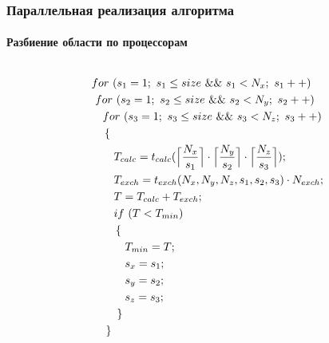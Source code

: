 \begin{frame}
\begin{center}
\frametitle{Параллельная реализация алгоритма}
\framesubtitle{Разбиение области по процессорам}

\begin{figure}
\begin{columns}[T]

\begin{column}{.4\textwidth}
\begin{scriptsize}
\begin{equation*}
\begin{aligned}
&for\ (s_1 = 1;\ s_1 \leq size\ \&\& \ s_1 < N_x;\ s_1++) \\
&\ for\ (s_2 = 1;\ s_2 \leq size\ \&\& \ s_2 < N_y;\ s_2++) \\
&\quad for\ (s_3 = 1;\ s_3 \leq size\ \&\& \ s_3 < N_z;\ s_3++) \\
&\quad \left\{ \right.\\
&\qquad T_{calc} = t_{calc}(\Bigl{\lceil} \frac{N_x}{s_1} \Bigr{\rceil} \cdot \Bigl{\lceil} \frac{N_y}{s_2} \Bigr{\rceil} \cdot \Bigl{\lceil} \frac{N_z}{s_3} \Bigr{\rceil});\\
&\qquad T_{exch} = t_{exch}(N_x,N_y,N_z,s_1,s_2,s_3) \cdot N_{exch};\\
&\qquad T = T_{calc} + T_{exch};\\
&\qquad if\ (T < T_{min})\\
&\qquad \left\{ \right.\\
&\qquad \quad T_{min}=T;\\
&\qquad \quad s_x = s_1;\\
&\qquad \quad s_y=s_2;\\
&\qquad \quad s_z=s_3;\\
&\qquad \left. \right\} \\
&\quad \left. \right\}
\end{aligned}
\end{equation*}
\end{scriptsize}



\end{column}
\hfill


\end{columns}
\end{figure}
\end{center}
\end{frame}
